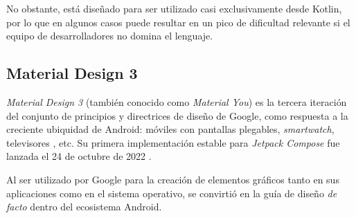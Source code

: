         No obstante, está diseñado para ser utilizado casi exclusivamente desde Kotlin, por lo que en algunos casos puede resultar en un pico de dificultad relevante si el equipo de desarrolladores no domina el lenguaje.
    
    \subsection{Material Design 3}
        \textit{Material Design 3} (también conocido como \textit{Material You}) es la tercera iteración del conjunto de principios y directrices de diseño de Google, como respuesta a la creciente ubiquidad de Android: móviles con pantallas plegables, \textit{smartwatch}, televisores \cite{ramirez_que_2022}, etc. Su primera implementación estable para \textit{Jetpack Compose} fue lanzada el 24 de octubre de 2022 \cite{singh_material_2022}.
        
        Al ser utilizado por Google para la creación de elementos gráficos tanto en sus aplicaciones como en el sistema operativo, se convirtió en la guía de diseño \textit{de facto} dentro del ecosistema Android.

